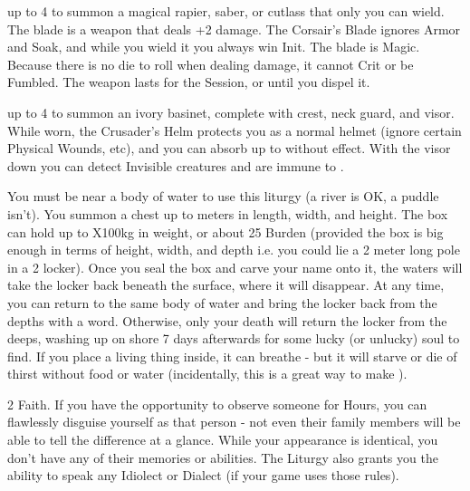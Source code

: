 \begin{multicols*}{2}
 up to 4 \DICE to summon a magical rapier, saber, or cutlass that only you can wield.  The blade is a \FOC weapon that deals \DICE+2 damage. The Corsair's Blade ignores Armor and Soak, and while you wield it you always win Init. The blade is Magic. Because there is no die to roll when dealing damage, it cannot Crit or be Fumbled. The weapon lasts for the Session, or until you dispel it.



\newpage

\LITURGY [
  Name = Crusader's Helm,
  Link = arcana-mystery-crusaders-helm,
  Paradigm = Righteous
]


 up to 4 \DICE to summon an ivory basinet, complete with crest, neck guard, and visor.  While worn, the Crusader's Helm protects you as a normal helmet (ignore certain Physical Wounds, etc), and you can absorb up to \DICE {} without effect.  With the visor down you can detect Invisible creatures and are immune to . 

\LITURGY [
  Name = Davy Jones's Locker,
  Link = arcana-mystery-davy-joness-locker,
  Paradigm = Cthonic
]

You must be near a body of water to use this liturgy (a river is OK, a puddle isn't).  You summon a chest up to \DICE meters in length, width, and height.  The box can hold up to \DICE X100kg in weight, or about 25 Burden (provided the box is big enough in terms of height, width, and depth i.e. you could lie a 2 meter long pole in a 2 \DICE locker).  Once you seal the box and carve your name onto it, the waters will take the locker back beneath the surface, where it will disappear.  At any time, you can return to the same body of water and bring the locker back from the depths with a word. Otherwise, only your death will return the locker from the deeps, washing up on shore 7 days afterwards for some lucky (or unlucky) soul to find. If you place a living thing inside, it can breathe - but it will starve or die of thirst without food or water (incidentally, this is a great way to make ).

\LITURGY [
  Name = Doppelg{\UmlautA}nger,
  Link = arcana-mystery-doppelganger,
  Paradigm = Cunning
]

 2 Faith. If you have the opportunity to observe someone for Hours, you can flawlessly disguise yourself as that person - not even their family members will be able to tell the difference at a glance.  While your appearance is identical, you don't have any of their memories or abilities. The Liturgy also grants you the ability to speak any Idiolect or Dialect (if your game uses those rules).


\end{multicols*}
